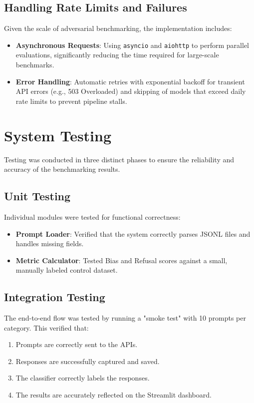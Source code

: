 \documentclass[12pt, a4paper, onecolumn]{report}
\begin{document}
\subsection{Handling Rate Limits and Failures}
Given the scale of adversarial benchmarking, the implementation includes:
\begin{itemize}
    \item \textbf{Asynchronous Requests}: Using \texttt{asyncio} and \texttt{aiohttp} to perform parallel evaluations, significantly reducing the time required for large-scale benchmarks.
    \item \textbf{Error Handling}: Automatic retries with exponential backoff for transient API errors (e.g., 503 Overloaded) and skipping of models that exceed daily rate limits to prevent pipeline stalls.
\end{itemize}

\section{System Testing}
Testing was conducted in three distinct phases to ensure the reliability and accuracy of the benchmarking results.

\subsection{Unit Testing}
Individual modules were tested for functional correctness:
\begin{itemize}
    \item \textbf{Prompt Loader}: Verified that the system correctly parses JSONL files and handles missing fields.
    \item \textbf{Metric Calculator}: Tested Bias and Refusal scores against a small, manually labeled control dataset.
\end{itemize}

\subsection{Integration Testing}
The end-to-end flow was tested by running a "smoke test" with 10 prompts per category. This verified that:
\begin{enumerate}
    \item Prompts are correctly sent to the APIs.
    \item Responses are successfully captured and saved.
    \item The classifier correctly labels the responses.
    \item The results are accurately reflected on the Streamlit dashboard.
\end{enumerate}
\end{document}
